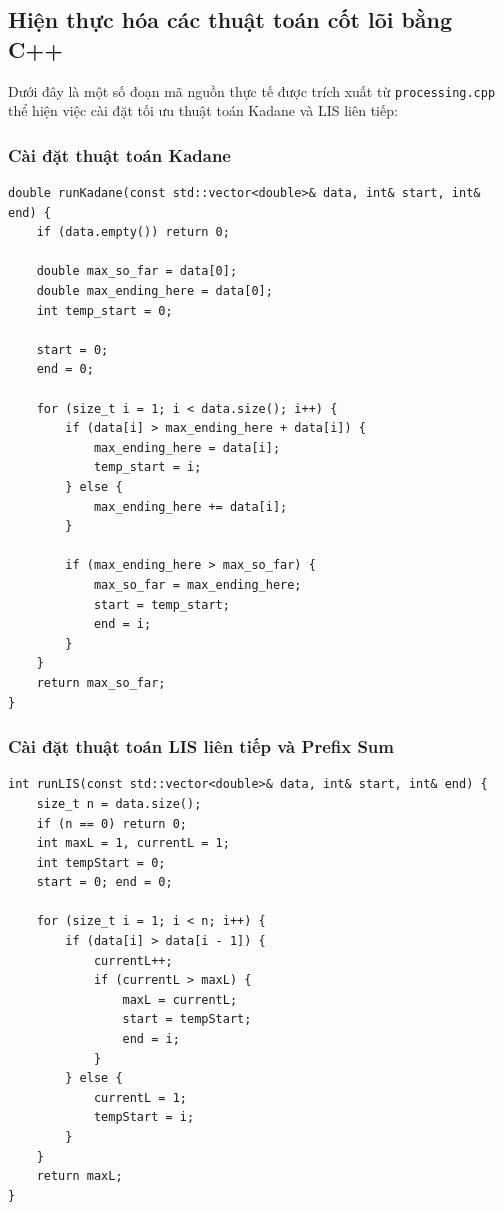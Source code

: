 \subsection{Hiện thực hóa các thuật toán cốt lõi bằng C++}
Dưới đây là một số đoạn mã nguồn thực tế được trích xuất từ \texttt{processing.cpp} thể hiện việc cài đặt tối ưu thuật toán Kadane và LIS liên tiếp:

\subsubsection{Cài đặt thuật toán Kadane}
\begin{lstlisting}[style=cppstyle, caption=Hàm runKadane trong processing.cpp]
double runKadane(const std::vector<double>& data, int& start, int& end) {
    if (data.empty()) return 0;

    double max_so_far = data[0];
    double max_ending_here = data[0];
    int temp_start = 0;
    
    start = 0;
    end = 0;

    for (size_t i = 1; i < data.size(); i++) {
        if (data[i] > max_ending_here + data[i]) {
            max_ending_here = data[i];
            temp_start = i;
        } else {
            max_ending_here += data[i];
        }

        if (max_ending_here > max_so_far) {
            max_so_far = max_ending_here;
            start = temp_start;
            end = i;
        }
    }
    return max_so_far;
}
\end{lstlisting}

\subsubsection{Cài đặt thuật toán LIS liên tiếp và Prefix Sum}
\begin{lstlisting}[style=cppstyle, caption=Hàm runLIS trong processing.cpp]
int runLIS(const std::vector<double>& data, int& start, int& end) {
    size_t n = data.size();
    if (n == 0) return 0;
    int maxL = 1, currentL = 1;
    int tempStart = 0;
    start = 0; end = 0;

    for (size_t i = 1; i < n; i++) {
        if (data[i] > data[i - 1]) {
            currentL++;
            if (currentL > maxL) {
                maxL = currentL;
                start = tempStart;
                end = i;
            }
        } else {
            currentL = 1;
            tempStart = i;
        }
    }
    return maxL;
}
\end{lstlisting}
